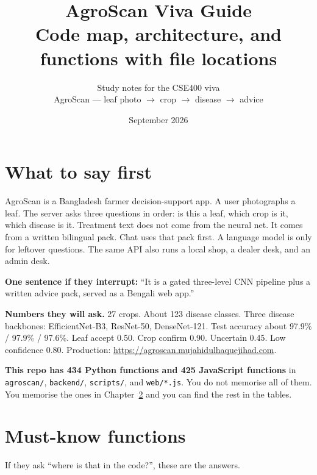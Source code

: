 \documentclass[Times,11pt,oneside,openany]{report}
\title{\textbf{AgroScan Viva Guide}\\[0.4em]
\large Code map, architecture, and functions with file locations}
\author{Study notes for the CSE400 viva\\AgroScan --- leaf photo $\rightarrow$ crop $\rightarrow$ disease $\rightarrow$ advice}
\date{September 2026}
\begin{document}
\maketitle
\tableofcontents
\listoftables
\listoffigures

\chapter{What to say first}
AgroScan is a Bangladesh farmer decision-support app. A user photographs a leaf. The server asks three questions in order: is this a leaf, which crop is it, which disease is it. Treatment text does not come from the neural net. It comes from a written bilingual pack. Chat uses that pack first. A language model is only for leftover questions. The same API also runs a local shop, a dealer desk, and an admin desk.

\textbf{One sentence if they interrupt:} ``It is a gated three-level CNN pipeline plus a written advice pack, served as a Bengali web app.''

\textbf{Numbers they will ask.} 27 crops. About 123 disease classes. Three disease backbones: EfficientNet-B3, ResNet-50, DenseNet-121. Test accuracy about 97.9\% / 97.9\% / 97.6\%. Leaf accept 0.50. Crop confirm 0.90. Uncertain 0.45. Low confidence 0.80. Production: \url{https://agroscan.mujahidulhaquejihad.com}.

\textbf{This repo has 434 Python functions and 425 JavaScript functions} in \texttt{agroscan/}, \texttt{backend/}, \texttt{scripts/}, and \texttt{web/*.js}. You do not memorise all of them. You memorise the ones in Chapter~\ref{ch:must} and you can find the rest in the tables.

\chapter{Must-know functions}
\label{ch:must}
If they ask ``where is that in the code?'', these are the answers.
\end{document}
